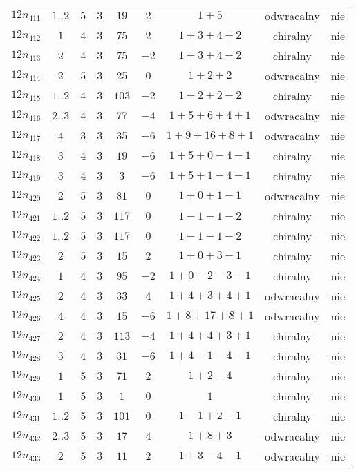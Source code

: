 \begin{longtable}{ccccccccc}
$12n_{411}$ & $1..2$ & $5$ & $3$ & $19$ & $2$ & $1+5$ & odwracalny & nie \\
$12n_{412}$ & $1$ & $4$ & $3$ & $75$ & $2$ & $1+3+4+2$ & chiralny & nie \\
$12n_{413}$ & $2$ & $4$ & $3$ & $75$ & $-2$ & $1+3+4+2$ & chiralny & nie \\
$12n_{414}$ & $2$ & $5$ & $3$ & $25$ & $0$ & $1+2+2$ & odwracalny & nie \\
$12n_{415}$ & $1..2$ & $4$ & $3$ & $103$ & $-2$ & $1+2+2+2$ & chiralny & nie \\
$12n_{416}$ & $2..3$ & $4$ & $3$ & $77$ & $-4$ & $1+5+6+4+1$ & odwracalny & nie \\
$12n_{417}$ & $4$ & $3$ & $3$ & $35$ & $-6$ & $1+9+16+8+1$ & odwracalny & nie \\
$12n_{418}$ & $3$ & $4$ & $3$ & $19$ & $-6$ & $1+5+0-4-1$ & chiralny & nie \\
$12n_{419}$ & $3$ & $4$ & $3$ & $3$ & $-6$ & $1+5+1-4-1$ & chiralny & nie \\
$12n_{420}$ & $2$ & $5$ & $3$ & $81$ & $0$ & $1+0+1-1$ & odwracalny & nie \\
$12n_{421}$ & $1..2$ & $5$ & $3$ & $117$ & $0$ & $1-1-1-2$ & chiralny & nie \\
$12n_{422}$ & $1..2$ & $5$ & $3$ & $117$ & $0$ & $1-1-1-2$ & chiralny & nie \\
$12n_{423}$ & $2$ & $5$ & $3$ & $15$ & $2$ & $1+0+3+1$ & chiralny & nie \\
$12n_{424}$ & $1$ & $4$ & $3$ & $95$ & $-2$ & $1+0-2-3-1$ & chiralny & nie \\
$12n_{425}$ & $2$ & $4$ & $3$ & $33$ & $4$ & $1+4+3+4+1$ & odwracalny & nie \\
$12n_{426}$ & $4$ & $4$ & $3$ & $15$ & $-6$ & $1+8+17+8+1$ & odwracalny & nie \\
$12n_{427}$ & $2$ & $4$ & $3$ & $113$ & $-4$ & $1+4+4+3+1$ & chiralny & nie \\
$12n_{428}$ & $3$ & $4$ & $3$ & $31$ & $-6$ & $1+4-1-4-1$ & chiralny & nie \\
$12n_{429}$ & $1$ & $5$ & $3$ & $71$ & $2$ & $1+2-4$ & chiralny & nie \\
$12n_{430}$ & $1$ & $5$ & $3$ & $1$ & $0$ & $1$ & chiralny & nie \\
$12n_{431}$ & $1..2$ & $5$ & $3$ & $101$ & $0$ & $1-1+2-1$ & chiralny & nie \\
$12n_{432}$ & $2..3$ & $5$ & $3$ & $17$ & $4$ & $1+8+3$ & odwracalny & nie \\
$12n_{433}$ & $2$ & $5$ & $3$ & $11$ & $2$ & $1+3-4-1$ & odwracalny & nie \\

\end{longtable}

